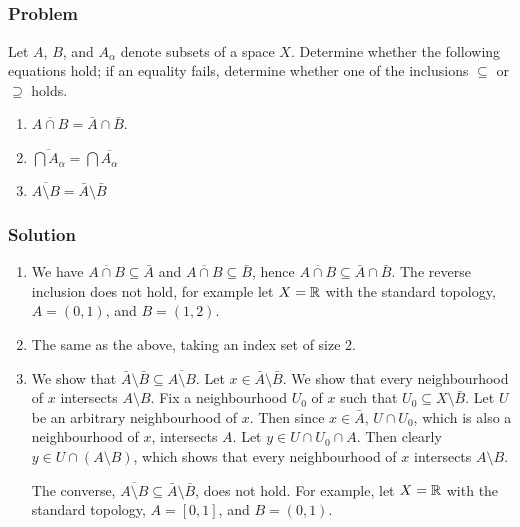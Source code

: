 \subsection{}

\subsubsection{Problem}
Let $A$, $B$, and $A_\alpha$ denote subsets of a space $X$. Determine whether the following equations hold; if an equality fails, determine whether one of the inclusions $\subseteq$ or $\supseteq$ holds.
\begin{enumerate}
 \item $\overline{A \cap B} = \bar A \cap \bar B$.
 \item $\overline{\bigcap A_\alpha} = \bigcap \overline{A_\alpha}$
 \item $\overline{A \setminus B} = \bar A \setminus \bar B$
\end{enumerate}
 
\subsubsection{Solution}
\begin{enumerate}
 \item We have $\overline{A \cap B} \subseteq \bar A$ and $\overline{A \cap B} \subseteq \bar B$, hence $\overline{A \cap B} \subseteq \bar A \cap \bar B$. The reverse inclusion does not hold, for example let $X = \mathbb R$ with the standard topology, $A = (0,1)$, and $B = (1,2)$.
 
 \item The same as the above, taking an index set of size 2.
 
 \item We show that $\bar A \setminus \bar B \subseteq \overline{A \setminus B}$. Let $x \in \bar A \setminus \bar B$. We show that every neighbourhood of $x$ intersects $A \setminus B$. Fix a neighbourhood $U_0$ of $x$ such that $U_0 \subseteq X \setminus \bar B$. Let $U$ be an arbitrary neighbourhood of $x$. Then since $x \in \bar A$, $U \cap U_0$, which is also a neighbourhood of $x$, intersects $A$. Let $y \in U \cap U_0 \cap A$. Then clearly $y \in U \cap (A \setminus B)$, which shows that every neighbourhood of $x$ intersects $A \setminus B$.
 
 The converse, $\overline{A \setminus B} \subseteq \bar A \setminus \bar B$, does not hold. For example, let $X = \mathbb R$ with the standard topology, $A = [0,1]$, and $B = (0,1)$. 
\end{enumerate}

